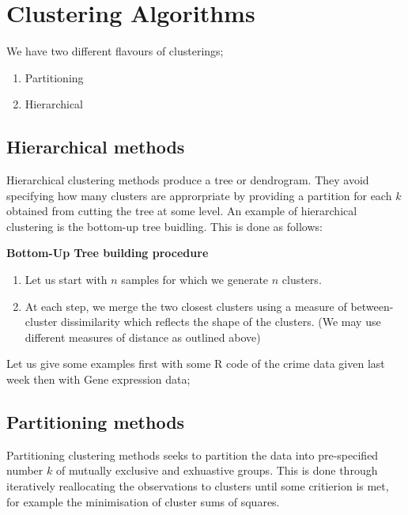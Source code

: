 \documentclass[twoside]{article}
\theoremstyle{definition}
\theoremstyle{definition}
\begin{document}
\section{Clustering Algorithms}
We have two different flavours of clusterings;
\begin{enumerate}
	\item Partitioning
	\item Hierarchical
\end{enumerate}

\subsection{Hierarchical methods}
Hierarchical clustering methods produce a tree or dendrogram. They avoid specifying how many clusters are approrpriate by providing a partition for each $k$ obtained from cutting the tree at some level. An example of hierarchical clustering is the bottom-up tree buidling. This is done as follows:

\begin{dBox}
	\textbf{Bottom-Up Tree building procedure}
	\begin{enumerate}
		\item Let us start with $n$ samples for which we generate $n$ clusters.
		\item At each step, we merge the two closest clusters using a measure of between-cluster dissimilarity which reflects the shape of the clusters. (We may use different measures of distance as outlined above) 
	\end{enumerate}
\end{dBox}

Let us give some examples first with some R code of the crime data given last week then with Gene expression data;

\begin{cBox}
	
\end{cBox}

\begin{cBox}
	
\end{cBox}

\subsection{Partitioning methods}
Partitioning clustering methods seeks to partition the data into pre-specified number $k$ of mutually exclusive and exhuastive groups. This is done through iteratively reallocating the observations to clusters until some critierion is met, for example the minimisation of cluster sums of squares. 
\end{document}

